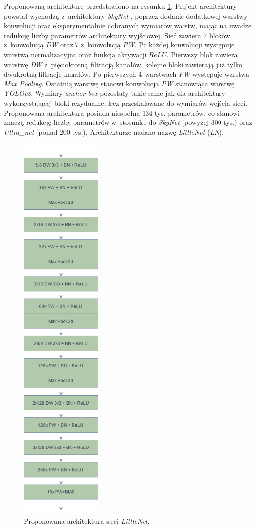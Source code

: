 Proponowaną architekturę przedstawiono na rysunku \ref{fig:LN_arch}. 
Projekt architektury powstał wychodzą z~architektury \emph{SkyNet} \cite{skynet}, 
poprzez dodanie dodatkowej warstwy konwolucji oraz eksperymentalnie dobranych wymiarów warstw, mając na uwadze redukcję liczby parametrów architektury wyjściowej. 
Sieć zawiera 7 bloków z~konwolucją \emph{DW} oraz 7 z~konwolucją \emph{PW}. 
Po każdej konwolucji występuje warstwa normalizacyjna oraz funkcja aktywacji $ReLU$. 
Pierwszy blok zawiera warstwę \emph{DW} z~pięciokrotną filtracją kanałów, kolejne bloki zawierają już tylko dwukrotną filtrację kanałów.
Po pierwszych 4~warstwach \emph{PW} występuje warstwa \emph{Max Pooling}. 
Ostatnią warstwę stanowi konwolucja \emph{PW} stanowiąca warstwę \emph{YOLOv3}. 
Wymiary \emph{anchor box} pozostały takie same jak dla architektury wykorzystującej bloki rezydualne, lecz przeskalowane do wymiarów wejścia sieci. 
Proponowana architektura posiada niespełna 134 tys. parametrów, co stanowi znaczą redukcję liczby parametrów w~stosunku do \emph{SkyNet} (powyżej 300 tys.) oraz \emph{Ultra\_net} (ponad 200 tys.). 
Architekturze nadano %
nazwę \emph{LittleNet} (\emph{LN}).
\begin{figure}
    \centering
    \includegraphics[width=4cm]{images/LNv1}
    \caption{Proponowana architektura sieci \emph{LittleNet}.}
    \label{fig:LN_arch}
\end{figure}

